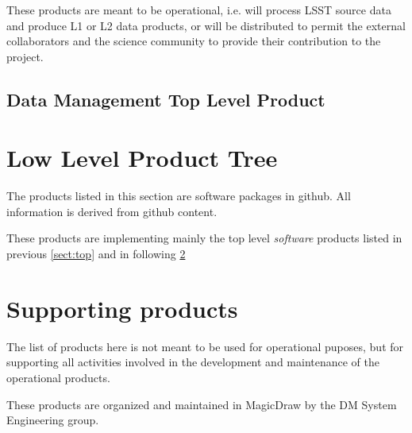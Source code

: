 These products are meant to be operational, i.e. will process LSST source data and produce L1 or L2 data products, or will be distributed to permit the external collaborators and the science community to provide their contribution to the project.

\subsection{Data Management Top Level Product}\label{sec:dmtop}



\newpage
\section{Low Level Product Tree}\label{sect:low}

The products listed in this section are software packages in github.
All information is derived from github content.

These products are implementing mainly the top level \textit{software} products listed in previous \ref{sect:top} and in following \ref{sect:sups}



\section{Supporting products}\label{sect:sups}

The list of products here is not meant to be used for operational puposes, but for supporting all activities involved in the development and maintenance of the operational products. 

These products are organized and maintained in MagicDraw by the DM System Engineering group.


